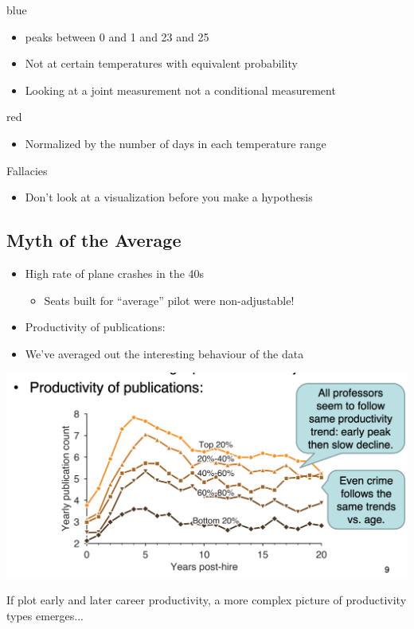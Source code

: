 \documentclass[11pt]{article}
\theoremstyle{definition}
\begin{document}
blue 
\begin{itemize}
    \item peaks between 0 and 1 and 23 and 25
    \item Not at certain temperatures with equivalent probability
    \item Looking at a joint measurement not a conditional measurement
\end{itemize}

red 
\begin{itemize}
    \item Normalized by the number of days in each temperature range
\end{itemize}

Fallacies
\begin{itemize}
    \item Don't look at a visualization before you make a hypothesis
\end{itemize}

\subsection{Myth of the Average}
\begin{itemize}
    \item High rate of plane crashes in the 40s
    \begin{itemize}
        \item Seats built for “average” pilot were non-adjustable!
    \end{itemize}
    \item Productivity of publications:
    \item We've averaged out the interesting behaviour of the data
\end{itemize}

\includegraphics[width=\textwidth]{30.png}

If plot early and later career productivity, a more
complex picture of productivity types emerges...
\end{document}
